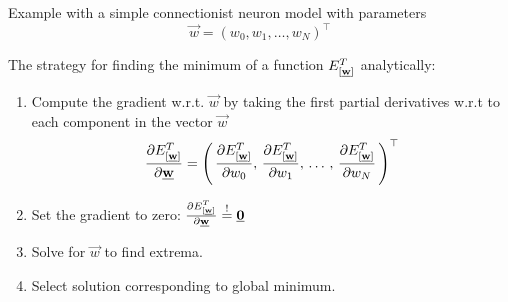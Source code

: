 \begin{frame}\frametitle{\subsecname}

    Example with a simple connectionist neuron model
    with parameters
    $$\vec w = (w_{0}, w_{1}, \ldots, w_{N})^{\top}$$

    The strategy for finding the minimum of a function ${E}^T_{[\underline{\mathbf{w}}]}$ analytically:
    \begin{enumerate}
    \item<2-> Compute the gradient w.r.t. $\vec w$ by taking the first partial derivatives w.r.t to each component in the vector $\vec w$
    \begin{equation}
        \frac{\partial {E}^T_{[\underline{\mathbf{w}}]}}{\partial \underline{\mathbf{w}}} = \left(\,
        \frac{\partial {E}^T_{[\underline{\mathbf{w}}]}}{\partial w_{0}}, \,
        \frac{\partial {E}^T_{[\underline{\mathbf{w}}]}}{\partial w_{1}}, \,\ldots\,,\, 
        \frac{\partial {E}^T_{[\underline{\mathbf{w}}]}}{\partial w_{N}}\,
        \right)^{\top}
        \label{eq:gradient_partial}
    \end{equation}
    
    \item<3-> Set the gradient to zero: $\frac{\partial {E}^T_{[\underline{\mathbf{w}}]}}{\partial \underline{\mathbf{w}}} \stackrel{\mathrm{!}}{=} \underline{\mathbf{0}}$
    \item<4-> Solve for $\vec w$ to find extrema.
    \item<5-> Select solution corresponding to global minimum.
    
    \end{enumerate}
\end{frame}


